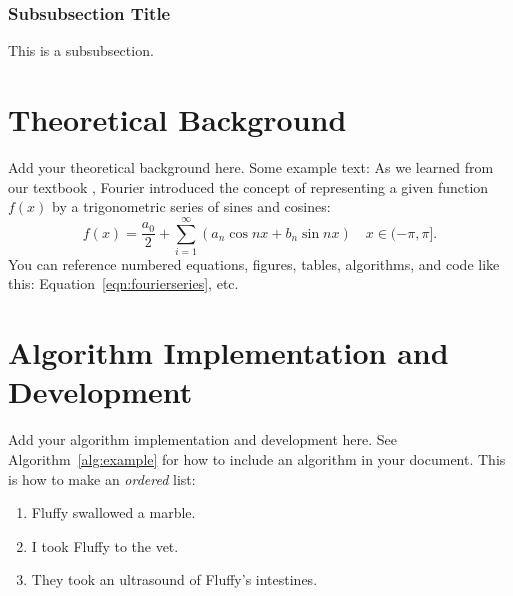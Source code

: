 \documentclass{artikel3}
\begin{document}
\subsubsection{Subsubsection Title}
This is a subsubsection.

\section{Theoretical Background}
Add your theoretical background here. Some example text: As we learned from our textbook \cite{kutz_2013}, Fourier introduced the concept of representing a given function $f(x)$ by a trigonometric series of sines and cosines:
\begin{equation}
    f(x) = \frac{a_0}{2} + \sum_{i=1}^\infty \left(a_n\cos{nx} + b_n\sin{nx}\right) \quad x \in (-\pi,\pi].
    \label{eqn:fourierseries}
\end{equation}
You can reference numbered equations, figures, tables, algorithms, and code like this: Equation~\ref{eqn:fourierseries}, etc.

\section{Algorithm Implementation and Development}
Add your algorithm implementation and development here. See Algorithm~\ref{alg:example} for how to include an algorithm in your document. This is how to make an \textit{ordered} list:
\begin{enumerate}
    \item Fluffy swallowed a marble.
    \item I took Fluffy to the vet.
    \item They took an ultrasound of Fluffy's intestines.
\end{enumerate}

\end{document}
